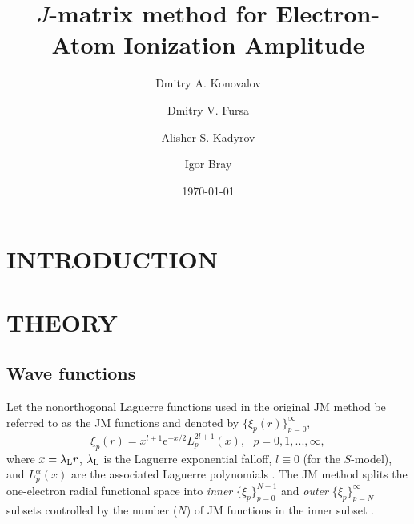 \documentclass[aip
, pra
, showpacs
, aps
, twocolumn
, groupedaddress
, floatfix
]{revtex4}
\begin{document}
\title {$J$-matrix method for Electron-Atom Ionization Amplitude}

\author{Dmitry A. Konovalov}

\author{Dmitry V. Fursa}

\author{Alisher S. Kadyrov}

\author{Igor Bray}

\date{\today}

\begin{abstract}


\end{abstract}

\maketitle


\section{INTRODUCTION}

\cite{KMSB03l}


\section{THEORY}

\subsection{Wave functions}
Let the nonorthogonal Laguerre functions used in the original JM method \cite{HY74p1201,BR76p1491}
be referred to as the JM functions and denoted by $\{\xi_p(r)\}_{p=0}^\infty$,
\[
\xi_p(r) = x^{l+1} \mbox{e}^{-x /2}
L_p^{2l+1}(x), \ \ \ p = 0, 1, ..., \infty,
\]
where $x=\lambda_{\rm L} r$,  $\lambda_{\rm L}$ is the Laguerre exponential falloff,
$l \equiv 0$ (for the $S$-model), and $L_p^{\alpha}(x)$ are the associated Laguerre polynomials \cite{abramowitz}.
The JM method splits the one-electron radial functional space into {\em inner} $\{\xi_p\}_{p=0}^{N-1}$
and {\em outer} $\{\xi_p\}_{p=N}^\infty$
subsets controlled by the number ($N$) of JM functions in the inner subset \cite{HY74p1201,BR76p1491}.
\end{document}
